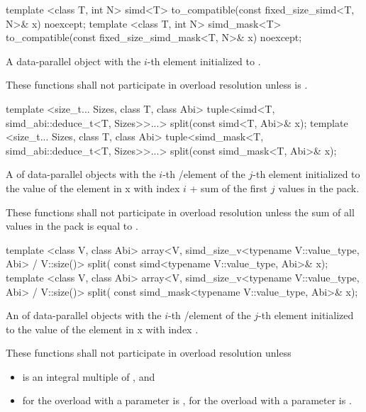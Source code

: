 \begin{itemdecl}
template <class T, int N> simd<T> to_compatible(const fixed_size_simd<T, N>& x) noexcept;
template <class T, int N> simd_mask<T> to_compatible(const fixed_size_simd_mask<T, N>& x) noexcept;
\end{itemdecl}
\begin{itemdescr}
  \pnum\returns A data-parallel object with the $i$-th element initialized to  \foralli.

  \pnum\remarks These functions shall not participate in overload resolution unless  is \true.
\end{itemdescr}

\begin{itemdecl}
template <size_t... Sizes, class T, class Abi>
tuple<simd<T, simd_abi::deduce_t<T, Sizes>>...> split(const simd<T, Abi>& x);
template <size_t... Sizes, class T, class Abi>
tuple<simd_mask<T, simd_abi::deduce_t<T, Sizes>>...> split(const simd_mask<T, Abi>& x);
\end{itemdecl}
\begin{itemdescr}
  \pnum\returns A  of data-parallel objects with the $i$-th \simd/\mask element of the $j$-th  element initialized to the value of the element in \code x with index $i$ + sum of the first $j$ values in the  pack.

  \pnum\remarks These functions shall not participate in overload resolution unless the sum of all values in the  pack is equal to .
\end{itemdescr}

\begin{itemdecl}
template <class V, class Abi>
array<V, simd_size_v<typename V::value_type, Abi> / V::size()> split(
    const simd<typename V::value_type, Abi>& x);
template <class V, class Abi>
array<V, simd_size_v<typename V::value_type, Abi> / V::size()> split(
    const simd_mask<typename V::value_type, Abi>& x);
\end{itemdecl}
\begin{itemdescr}
  \pnum\returns An  of data-parallel objects with the $i$-th \simd/\mask element of the $j$-th  element initialized to the value of the element in \code x with index .

  \pnum\remarks These functions shall not participate in overload resolution unless
  \begin{itemize}
    \item {} is an integral multiple of , and
    \item for the overload with a \simd parameter  is \true,
          for the overload with a \mask parameter  is \true.
  \end{itemize}
\end{itemdescr}

